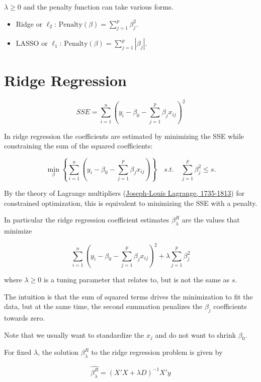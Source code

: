 \documentclass[
  letterpaper,
  DIV=11,
  numbers=noendperiod]{scrreport}
\providecommand{\tightlist}{%
  \setlength{\itemsep}{0pt}\setlength{\parskip}{0pt}}\usepackage{longtable,booktabs,array}
\begin{document}
\(\lambda \geq 0\) and the penalty function can take various forms.

\begin{itemize}
\tightlist
\item
  Ridge or \(\ell_2\):
  \(\text{Penalty}(\beta) = \sum_{j=1}^p \beta_j^2.\)
\item
  LASSO or \(\ell_1\):
  \(\text{Penalty}(\beta) = \sum_{j=1}^p |\beta_j|.\)
\end{itemize}


\hypertarget{ridge-regression}{%
\chapter{Ridge Regression}\label{ridge-regression}}

\[SSE = \sum_{i=1}^n \left( 
y_i - \beta_0 - \sum_{j=1}^p \beta_j x_{ij}
\right)^2\]

In ridge regression the coefficients are estimated by minimizing the SSE
while constraining the sum of the squared coefficients:

\[\min_{\beta} \left\{ 
\sum_{i=1}^n \left( 
y_i - \beta_0 - \sum_{j=1}^p \beta_j x_{ij}
\right)
\right\} \quad s.t. \quad 
\sum_{j=1}^p \beta_j^2 \leq s.
\]

By the theory of Lagrange multipliers
(\href{https://en.wikipedia.org/wiki/Joseph-Louis_Lagrange}{Joseph-Louis
Lagrange, 1735-1813}) for constrained optimization, this is equivalent
to minimizing the SSE with a penalty.

In particular the ridge regression coefficient estimates
\(\beta_{\lambda}^R\) are the values that minimize

\[
\sum_{i=1}^n \left( 
y_i - \beta_0 - \sum_{j=1}^p \beta_j x_{ij}
\right)^2 + 
\lambda \sum_{j=1}^p \beta_j^2
\]

where \(\lambda \geq 0\) is a tuning parameter that relates to, but is
not the same as \(s\).

The intuition is that the sum of squared terms drives the minimization
to fit the data, but at the same time, the second summation penalizes
the \(\beta_j\) coefficients towards zero.

Note that we usually want to standardize the \(x_j\) and do not want to
shrink \(\beta_0\).

For fixed \(\lambda\), the solution \(\beta_{\lambda}^R\) to the ridge
regression problem is given by

\[\hat{\beta_{\lambda}^R} = (X'X + \lambda D)^{-1} X'y\]
\end{document}
